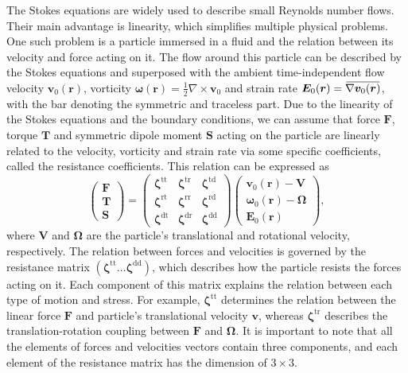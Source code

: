 \documentclass{master_thesis}
\newcommand{\overbar}[1]{\mkern 1.5mu\overline{\mkern-1.5mu#1\mkern-1.5mu}\mkern 1.5mu}
\begin{document}
The Stokes equations are widely used to describe small Reynolds number flows. Their main advantage is linearity, which simplifies multiple physical problems. One such problem is a particle immersed in a fluid and the relation between its velocity and force acting on it. The flow around this particle can be described by the Stokes equations and superposed with the ambient time-independent flow velocity $\boldsymbol{v}_0(\boldsymbol{r})$, vorticity $\boldsymbol{\omega}(\boldsymbol{r}) = \frac{1}{2}\nabla \times \boldsymbol{v}_0$ and strain rate $\boldsymbol{E}_0(\boldsymbol{r}) = \overbar{\nabla \boldsymbol{v}_0(\boldsymbol{r})}$, with the bar denoting the symmetric and traceless part. Due to the linearity of the Stokes equations and the boundary conditions, we can assume that force $\boldsymbol{F}$, torque $\boldsymbol{T}$ and symmetric dipole moment $\boldsymbol{S}$ acting on the particle are linearly related to the velocity, vorticity and strain rate via some specific coefficients, called the resistance coefficients. This relation can be expressed as
\begin{equation}
    \begin{pmatrix}
    \boldsymbol{F}\\\boldsymbol{T}\\\boldsymbol{S}
    \end{pmatrix}=\begin{pmatrix}
    \bm{\zeta}^{\textrm{tt}} & \bm{\zeta}^{\textrm{tr}} & \bm{\zeta}^{\textrm{td}} \\
    \bm{\zeta}^{\textrm{rt}} & \bm{\zeta}^{\textrm{rr}} & \bm{\zeta}^{\textrm{rd}} \\
    \bm{\zeta}^{\textrm{dt}} & \bm{\zeta}^{\textrm{dr}} & \bm{\zeta}^{\textrm{dd}}
    \end{pmatrix}
    \begin{pmatrix}
    \boldsymbol{v}_0(\boldsymbol{r})-\boldsymbol{V}\\
    \boldsymbol{\omega}_0(\boldsymbol{r})-\boldsymbol{\Omega}\\
    \boldsymbol{E}_0(\boldsymbol{r})
    \end{pmatrix},
\label{eqn:resistance_matrix}
\end{equation}
where $\boldsymbol{V}$ and $\boldsymbol{\Omega}$ are the particle's translational and rotational velocity, respectively. The relation between forces and velocities is governed by the resistance matrix $\left( \bm{\zeta}^{\textrm{tt}} \ldots \bm{\zeta}^{\textrm{dd}} \right)$, which describes how the particle resists the forces acting on it. Each component of this matrix explains the relation between each type of motion and stress. For example, $\bm{\zeta}^{\textrm{tt}}$ determines the relation between the linear force $\boldsymbol{F}$ and particle's translational velocity $\boldsymbol{v}$, whereas $\bm{\zeta}^{\textrm{tr}}$ describes the translation-rotation coupling between $\boldsymbol{F}$ and $\boldsymbol{\Omega}$. It is important to note that all the elements of forces and velocities vectors contain three components, and each element of the resistance matrix has the dimension of $3\times 3$.
\end{document}
